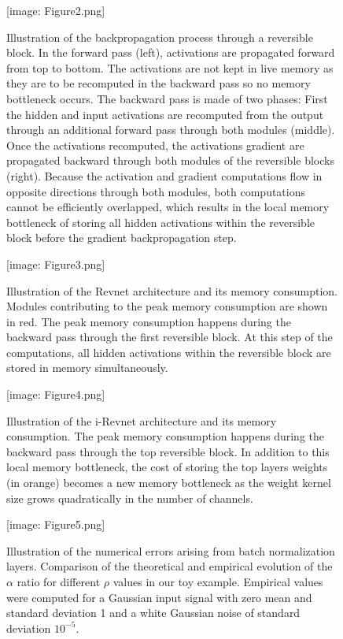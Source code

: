 \documentclass[twocolumn]{bmcart}
\def\texttt{[image: ]}
\begin{document}
\begin{backmatter}
\begin{figure}[t]
\texttt{[image: Figure2.png]}
\caption{
Illustration of the backpropagation process through a reversible block.
In the forward pass (left), activations are propagated forward from top to bottom.
The activations are not kept in live memory as they are to be recomputed in the backward pass so no memory bottleneck occurs.
The backward pass is made of two phases:
First the hidden and input activations are recomputed from the output through an additional forward pass through both modules (middle).
Once the activations recomputed, the activations gradient are propagated backward through both modules of the reversible blocks (right).
Because the activation and gradient computations flow in opposite directions through both modules,
both computations cannot be efficiently overlapped, which results in the local memory bottleneck of
storing all hidden activations within the reversible block before the gradient backpropagation step.
}
\end{figure}

\begin{figure}[t]
\texttt{[image: Figure3.png]}
\caption{
Illustration of the Revnet architecture and its memory consumption.
Modules contributing to the peak memory consumption are shown in red.
The peak memory consumption happens during the backward pass through the first reversible block.
At this step of the computations, all hidden activations within the reversible block are stored in memory simultaneously.
}
\end{figure}

\begin{figure}[t]
\texttt{[image: Figure4.png]}
\caption{
Illustration of the i-Revnet architecture and its memory consumption.
The peak memory consumption happens during the backward pass through the top reversible block.
In addition to this local memory bottleneck, the cost of storing the top layers weights
(in orange) becomes a new memory bottleneck as the
weight kernel size grows quadratically in the number of channels.
}
\end{figure}


\begin{figure}[t]
\texttt{[image: Figure5.png]}
\caption{
Illustration of the numerical errors arising from batch normalization layers.
Comparison of the theoretical and empirical evolution of the $\alpha$ ratio for different $\rho$ values in our toy example.
Empirical values were computed for a Gaussian input signal with zero mean and standard deviation 1 and a white Gaussian noise of standard deviation $10^{-5}$.
}
\end{figure}


\end{backmatter}
\end{document}
